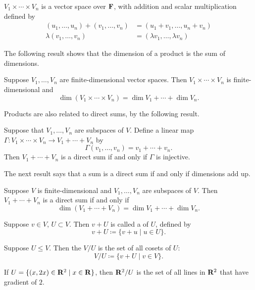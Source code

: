\begin{proposition}
$V_1\times\cdots\times V_n$ is a vector space over $\mathbf F$, with addition and scalar multiplication defined by
\begin{align*}
(u_1,\dots,u_n)+(v_1,\dots,v_n)&=(u_1+v_1,\dots,u_n+v_n)\\
\lambda(v_1,\dots,v_n)&=(\lambda v_1,\dots,\lambda v_n)
\end{align*}
\end{proposition}

The following result shows that the dimension of a product is the sum of dimensions.

\begin{proposition}
Suppose $V_1,\dots,V_n$ are finite-dimensional vector spaces. Then $V_1\times\cdots\times V_n$ is finite-dimensional and
\[\dim(V_1\times\cdots\times V_n)=\dim V_1+\cdots+\dim V_n.\]
\end{proposition}

Products are also related to direct sums, by the following result.

\begin{lemma}
Suppose that $V_1,\dots,V_n$ are subspaces of $V$. Define a linear map $\Gamma:V_1\times\cdots\times V_n\to V_1+\cdots+V_n$ by
\[\Gamma(v_1,\dots,v_n)=v_1+\cdots+v_n.\]
Then $V_1+\cdots+V_n$ is a direct sum if and only if $\Gamma$ is injective.
\end{lemma}

The next result says that a sum is a direct sum if and only if dimensions add up.

\begin{proposition}
Suppose $V$ is finite-dimensional and $V_1,\dots,V_n$ are subspaces of $V$. Then $V_1+\cdots+V_n$ is a direct sum if and only if
\[\dim(V_1+\cdots+V_n)=\dim V_1+\cdots+\dim V_n.\]
\end{proposition}

\begin{definition}[Coset]
Suppose $v\in V$, $U\subset V$. Then $v+U$ is called a  of $U$, defined by
\[v+U\coloneqq\{v+u\mid u\in U\}.\]
\end{definition}

\begin{definition}
Suppose $U\le V$. Then the  $V/U$ is the set of all cosets of $U$:
\[V/U\coloneqq\{v+U\mid v\in V\}.\]
\end{definition}

\begin{example}
If $U=\{(x,2x)\in\mathbf R^2\mid x\in\mathbf R\}$, then $\mathbf R^2/U$ is the set of all lines in $\mathbf R^2$ that have gradient of $2$.
\end{example}

